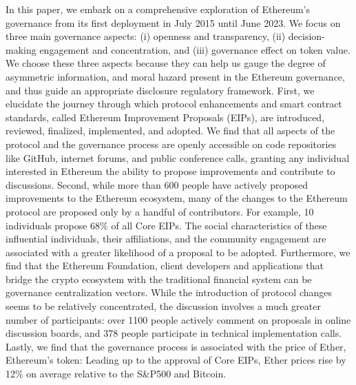 \documentclass[No]{AEA}
\begin{document}
In this paper, we embark on a comprehensive exploration of Ethereum's governance from its first deployment in July 2015  until June 2023. We focus on three main governance aspects: (i) openness and transparency, (ii) decision-making engagement and concentration, and (iii) governance effect on token value. We choose these three aspects because they can help us gauge the degree of asymmetric information, and moral hazard present in the Ethereum governance, and thus guide an appropriate disclosure regulatory framework. First, we elucidate the journey through which protocol enhancements and smart contract standards, called Ethereum Improvement Proposals (EIPs), are introduced, reviewed, finalized, implemented, and adopted. We find that all aspects of the protocol and the governance process are openly accessible on code repositories like GitHub, internet forums, and public conference calls, granting any individual interested in Ethereum the ability to propose improvements and contribute to discussions. Second, while more than 600 people have actively proposed improvements to the Ethereum ecosystem, many of the changes to the Ethereum protocol are proposed only by a handful of contributors. For example, 10 individuals propose 68\% of all Core EIPs. The social characteristics of these influential individuals, their affiliations, and the community engagement are associated with a greater likelihood of a proposal to be adopted. Furthermore, we find that the Ethereum Foundation, client developers and applications that bridge the crypto ecosystem with the traditional financial system can be governance centralization vectors. While the introduction of protocol changes seems to be relatively concentrated, the discussion involves a much greater number of participants: over 1100 people actively comment on proposals in online discussion boards, and 378 people participate in technical implementation calls. Lastly, we find that the governance process is associated with the price of Ether, Ethereum's token: Leading up to the approval of Core EIPs, Ether prices rise by 12\% on average relative to the S\&P500 and Bitcoin. 
\end{document}
